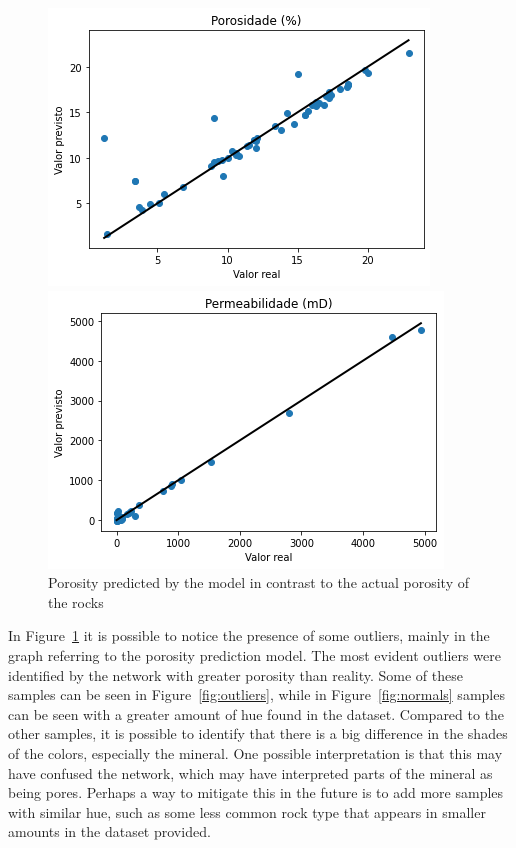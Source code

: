 \documentclass[a4paper,fleqn]{cas-sc}
\begin{document}
\begin{figure}[h!]
	\caption{Porosity predicted by the model in contrast to the actual porosity of the rocks}
	\label{fig:scatter}
	\centering%
	\begin{minipage}{0.45\textwidth}
		\includegraphics[width=\textwidth]{images/poro.png}
	\end{minipage}
	\begin{minipage}{0.45\textwidth}
		\includegraphics[width=\textwidth]{images/perm.png}
	\end{minipage}
\end{figure}

In Figure~\ref{fig:scatter} it is possible to notice the presence of some outliers, mainly in the graph referring to the porosity prediction model. The most evident outliers were identified by the network with greater porosity than reality. Some of these samples can be seen in Figure~\ref{fig:outliers}, while in Figure~\ref{fig:normals} samples can be seen with a greater amount of hue found in the dataset. Compared to the other samples, it is possible to identify that there is a big difference in the shades of the colors, especially the mineral. One possible interpretation is that this may have confused the network, which may have interpreted parts of the mineral as being pores. Perhaps a way to mitigate this in the future is to add more samples with similar hue, such as some less common rock type that appears in smaller amounts in the dataset provided.
\end{document}
